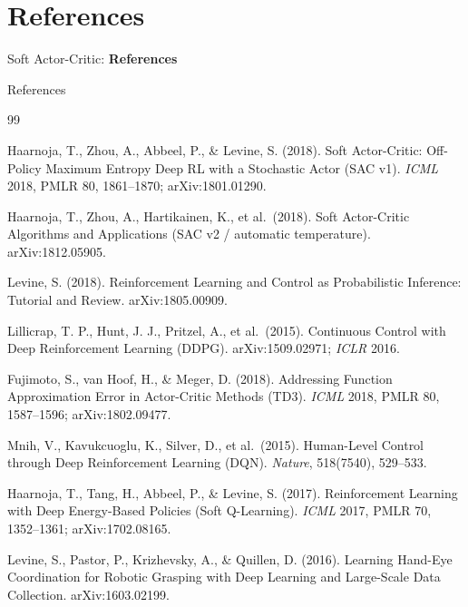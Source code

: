 \section{References}
\begin{frame}{}
    \LARGE Soft Actor-Critic: \textbf{References}
\end{frame}

\begin{frame}[allowframebreaks]{References}
\footnotesize
\begin{thebibliography}{99}

\hypertarget{ref:1}{}
Haarnoja, T., Zhou, A., Abbeel, P., \& Levine, S. (2018).
\newblock Soft Actor-Critic: Off-Policy Maximum Entropy Deep RL with a Stochastic Actor (SAC v1).
\newblock \emph{ICML} 2018, PMLR 80, 1861--1870; arXiv:1801.01290.

\hypertarget{ref:2}{}
Haarnoja, T., Zhou, A., Hartikainen, K., et al.\ (2018).
\newblock Soft Actor-Critic Algorithms and Applications (SAC v2 / automatic temperature).
\newblock arXiv:1812.05905.

\hypertarget{ref:3}{}
Levine, S. (2018).
\newblock Reinforcement Learning and Control as Probabilistic Inference: Tutorial and Review.
\newblock arXiv:1805.00909.

\hypertarget{ref:4}{}
Lillicrap, T. P., Hunt, J. J., Pritzel, A., et al.\ (2015).
\newblock Continuous Control with Deep Reinforcement Learning (DDPG).
\newblock arXiv:1509.02971; \emph{ICLR} 2016.

\hypertarget{ref:5}{}
Fujimoto, S., van Hoof, H., \& Meger, D. (2018).
\newblock Addressing Function Approximation Error in Actor-Critic Methods (TD3).
\newblock \emph{ICML} 2018, PMLR 80, 1587--1596; arXiv:1802.09477.

\hypertarget{ref:6}{}
Mnih, V., Kavukcuoglu, K., Silver, D., et al.\ (2015).
\newblock Human-Level Control through Deep Reinforcement Learning (DQN).
\newblock \emph{Nature}, 518(7540), 529--533.

\hypertarget{ref:7}{}
Haarnoja, T., Tang, H., Abbeel, P., \& Levine, S. (2017).
\newblock Reinforcement Learning with Deep Energy-Based Policies (Soft Q-Learning).
\newblock \emph{ICML} 2017, PMLR 70, 1352--1361; arXiv:1702.08165.

\hypertarget{ref:8}{}
Levine, S., Pastor, P., Krizhevsky, A., \& Quillen, D. (2016).
\newblock Learning Hand-Eye Coordination for Robotic Grasping with Deep Learning and Large-Scale Data Collection.
\newblock arXiv:1603.02199.


\end{thebibliography}
\end{frame}
